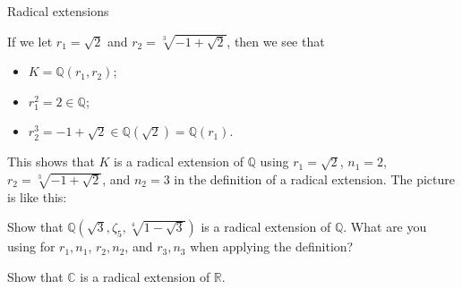 \begin{section}{Radical extensions}
\begin{example}
If we let $r_1 = \sqrt{2}$ and $r_2 = \sqrt[3]{-1 + \sqrt{2}}$, then we see that
\begin{itemize}
\item $K = \mathbb{Q}\left(r_1,r_2\right)$;
\item $r_1^2 = 2 \in \mathbb{Q}$; 
\item $r_2^3 = -1 + \sqrt{2} \in \mathbb{Q}\left(\sqrt{2}\right) = \mathbb{Q}\left(r_1\right)$.
\end{itemize}
This shows that $K$ is a radical extension of $\mathbb{Q}$ using $r_1 = \sqrt{2}$, $n_1 = 2$, $r_2 = \sqrt[3]{-1 + \sqrt{2}}$, and $n_2 = 3$ in the definition of a radical extension. The picture is like this:
\begin{center}
\end{center}
\end{example}

\begin{problem}
Show that  $\mathbb{Q}\left(\sqrt{3},\zeta_5,\sqrt[4]{1 - \sqrt{3}}\right)$ is a radical extension of $\mathbb{Q}$. What are you using for $r_1,n_1$, $r_2, n_2$, and $r_3, n_3$ when applying the definition?
\end{problem}

\begin{problem}
Show that $\mathbb{C}$ is a radical extension of $\mathbb{R}$.
\end{problem}
\end{section}

